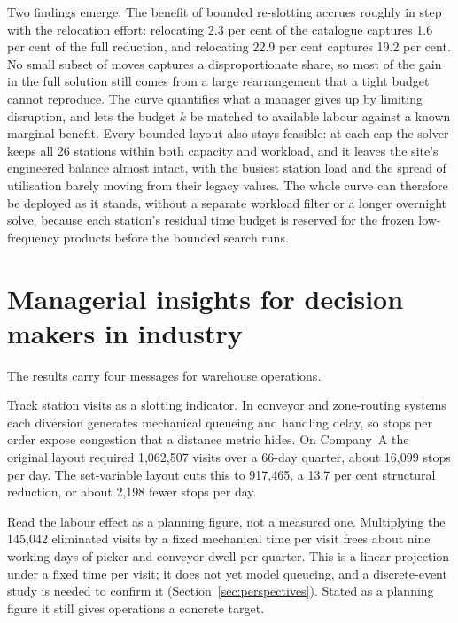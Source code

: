 \documentclass[]{interact}
\begin{document}
Two findings emerge. The benefit of bounded re-slotting accrues roughly in step with the relocation effort: relocating 2.3 per cent of the catalogue captures 1.6 per cent of the full reduction, and relocating 22.9 per cent captures 19.2 per cent. No small subset of moves captures a disproportionate share, so most of the gain in the full solution still comes from a large rearrangement that a tight budget cannot reproduce. The curve quantifies what a manager gives up by limiting disruption, and lets the budget $k$ be matched to available labour against a known marginal benefit. Every bounded layout also stays feasible: at each cap the solver keeps all 26 stations within both capacity and workload, and it leaves the site's engineered balance almost intact, with the busiest station load and the spread of utilisation barely moving from their legacy values. The whole curve can therefore be deployed as it stands, without a separate workload filter or a longer overnight solve, because each station's residual time budget is reserved for the frozen low-frequency products before the bounded search runs.

\section{Managerial insights for decision makers in industry}\label{sec:managerial}
The results carry four messages for warehouse operations.

Track station visits as a slotting indicator. In conveyor and zone-routing systems each diversion generates mechanical queueing and handling delay, so stops per order expose congestion that a distance metric hides. On Company~A the original layout required 1,062,507 visits over a 66-day quarter, about 16,099 stops per day. The set-variable layout cuts this to 917,465, a 13.7 per cent structural reduction, or about 2,198 fewer stops per day.

Read the labour effect as a planning figure, not a measured one. Multiplying the 145,042 eliminated visits by a fixed mechanical time per visit frees about nine working days of picker and conveyor dwell per quarter. This is a linear projection under a fixed time per visit; it does not yet model queueing, and a discrete-event study is needed to confirm it (Section~\ref{sec:perspectives}). Stated as a planning figure it still gives operations a concrete target.
\end{document}
